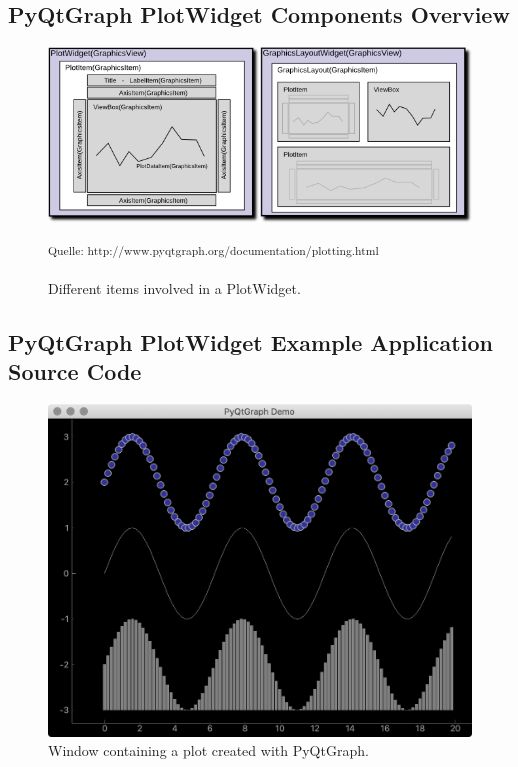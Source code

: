 
\subsection{PyQtGraph PlotWidget Components Overview}

\begin{figure}[h]
    \centering
    \includegraphics[width=14cm]{resources/img/PyQtGraphContent}
    \caption{Different items involved in a PlotWidget.}
    \small\textsuperscript{Quelle: http://www.pyqtgraph.org/documentation/plotting.html}
    \label{a:fig:pyqtgraph:content}
\end{figure}

\clearpage


\subsection{PyQtGraph PlotWidget Example Application Source Code}

\begin{figure}[h]
    \centering
    \includegraphics[width=14cm]{resources/img/PyQtGraphDemo}
    \caption{Window containing a plot created with PyQtGraph.}
    \label{a:fig:pyqtgraph:window}
\end{figure}

